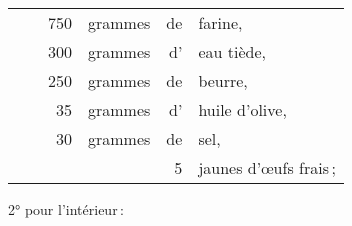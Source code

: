 \footnotesize
\begin{longtable}{rrrrrp{18em}}
 & \hspace{2em} &   750 & grammes  & de & farine,                                                         \\
 & \hspace{2em} &   300 & grammes  & d' & eau tiède,                                                      \\
 & \hspace{2em} &   250 & grammes  & de & beurre,                                                         \\
 & \hspace{2em} &    35 & grammes  & d' & huile d'olive,                                                  \\
 & \hspace{2em} &    30 & grammes  & de & sel,                                                            \\
 & \hspace{2em} &       &          &  5 & jaunes d'œufs frais ;                                           \\
\end{longtable}
\normalsize

2° pour l'intérieur :

